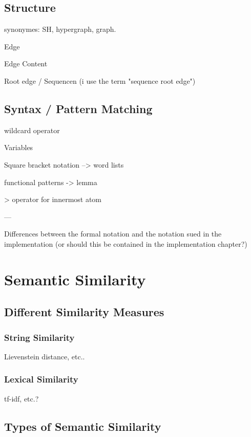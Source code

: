 \documentclass[11pt]{scrreprt}
\begin{document}
\subsection{Structure}

synonymes: SH, hypergraph, graph.

Edge

Edge Content

Root edge / Sequencen (i use the term "sequence root edge")

\subsection{Syntax / Pattern Matching}

wildcard operator

Variables

Square bracket notation --> word lists

functional patterns -> lemma

> operator for innermost atom


---

Differences between the formal notation and the notation sued in the implementation
(or should this be contained in the implementation chapter?)





\section{Semantic Similarity}

\subsection{Different Similarity Measures}

\subsubsection{String Similarity}
Lievenstein distance, etc..

\subsubsection{Lexical Similarity}
tf-idf, etc.?

\subsection{Types of Semantic Similarity}
\end{document}
